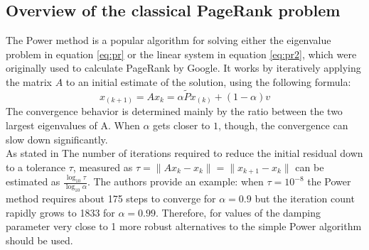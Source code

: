 \subsection{Overview of the classical PageRank problem}
The Power method is a popular algorithm for solving either the eigenvalue problem in equation \ref{eq:pr} or the linear system in equation \ref{eq:pr2}, which were originally used to calculate PageRank by Google. It works by iteratively applying the matrix $A$ to an initial estimate of the solution, using the following formula:
\begin{equation}\label{eq:power}
    x_{(k+1)} = Ax_k =\alpha \tilde P x_{(k)} + (1 - \alpha)v
\end{equation}
The convergence behavior is determined mainly by the ratio between the two largest eigenvalues of A. When $\alpha$ gets closer to $1$, though, the convergence can slow down significantly. \\

\noindent As stated in \cite{SHEN2022126799} The number of iterations required to reduce the initial residual down to a tolerance $\tau$, measured as $\tau = \lVert Ax_k - x_k \rVert = \lVert x_{k+1} - x_k \rVert$ can be estimated as $\frac{\log_{10} \tau}{\log_{10} \alpha}$. The authors provide an example: when $\tau = 10^{-8}$ the Power method requires about 175 steps to converge for $\alpha = 0.9$ but the iteration count rapidly grows to 1833 for $\alpha = 0.99$. Therefore, for values of the damping parameter very close to 1 more robust alternatives to the simple Power algorithm should be used.
